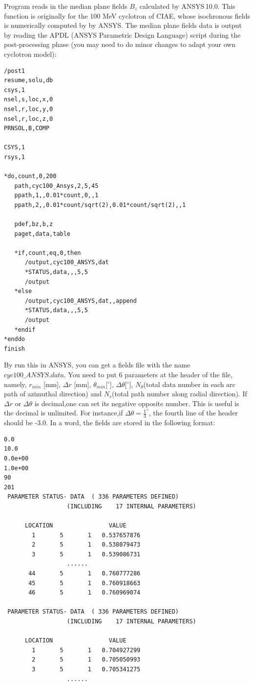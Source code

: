 Program reads in the median plane fields $B_z$ calculated by ANSYS\,10.0.  This function is originally for the 100 MeV cyclotron of CIAE,
 whose isochronous fields is numerically computed by by ANSYS. The median plane fields data is output by reading the APDL (ANSYS Parametric Design Language) script
during the post-processing phase (you may need to do minor changes to adapt your own cyclotron model):
\begin{fmpage}
\begin{footnotesize}
\begin{verbatim}
/post1
resume,solu,db
csys,1
nsel,s,loc,x,0
nsel,r,loc,y,0
nsel,r,loc,z,0
PRNSOL,B,COMP

CSYS,1
rsys,1

*do,count,0,200
   path,cyc100_Ansys,2,5,45
   ppath,1,,0.01*count,0,,1
   ppath,2,,0.01*count/sqrt(2),0.01*count/sqrt(2),,1

   pdef,bz,b,z
   paget,data,table

   *if,count,eq,0,then
      /output,cyc100_ANSYS,dat
      *STATUS,data,,,5,5
      /output
   *else
      /output,cyc100_ANSYS,dat,,append
      *STATUS,data,,,5,5
      /output
   *endif
*enddo
finish
\end{verbatim}
\end{footnotesize}
\end{fmpage}
By run this in ANSYS, you can get a fields file with the name $cyc100\_ANSYS.data$.
You need to  put 6 parameters at the header of the file, namely,
$r_{min}$ [mm], $\Delta r$ [mm], $\theta_{min}$[$^\circ$], $\Delta \theta$[$^\circ$],
$N_\theta$(total data number in each arc path of azimuthal direction) and $N_r$(total path number along radial direction).
If $\Delta r$ or $\Delta \theta$ is decimal,one can set its negative opposite number. This is useful is the decimal is unlimited.
For instance,if $\Delta \theta = \frac{1}{3}^\circ$, the fourth line of the header should be -3.0.
In a word, the fields are stored in the following format:
\begin{fmpage}
\begin{footnotesize}
\begin{verbatim}
0.0
10.0
0.0e+00
1.0e+00
90
201
 PARAMETER STATUS- DATA  ( 336 PARAMETERS DEFINED)
                  (INCLUDING    17 INTERNAL PARAMETERS)

      LOCATION                VALUE
        1       5       1   0.537657876
        2       5       1   0.538079473
        3       5       1   0.539086731
                  ......
       44       5       1   0.760777286
       45       5       1   0.760918663
       46       5       1   0.760969074

 PARAMETER STATUS- DATA  ( 336 PARAMETERS DEFINED)
                  (INCLUDING    17 INTERNAL PARAMETERS)

      LOCATION                VALUE
        1       5       1   0.704927299
        2       5       1   0.705050993
        3       5       1   0.705341275
                  ......
\end{verbatim}
\end{footnotesize}
\end{fmpage}


